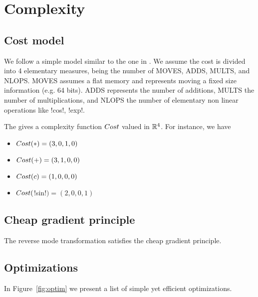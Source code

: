 \section{Complexity}
\label{sec:complexity}

\subsection{Cost model}
\label{sub:costModel}

We follow a simple model similar to the one in \cite{griewank2008evaluating}.
We assume the cost is divided into 4 elementary measures, being the number of MOVES, ADDS, MULTS, and NLOPS.
MOVES assumes a flat memory and represents moving a fixed size information  (e.g. 64 bits). 
ADDS represents the number of additions, 
MULTS the number of multiplications, 
and NLOPS the number of elementary non linear operations like !cos!, !exp!.

The gives a complexity function $Cost$ valued in $\mathbb{R}^4$. 
For instance, we have 

\begin{itemize}
    \item $Cost(*)=(3,0,1,0)$
    \item $Cost(+)=(3,1,0,0)$
    \item $Cost(c)=(1,0,0,0)$
    \item $Cost($!sin!$)=(2,0,0,1)$
\end{itemize}



\subsection{Cheap gradient principle}

\begin{theorem}
    The reverse mode transformation satisfies the cheap gradient principle.
\end{theorem}

\subsection{Optimizations} %
\label{sub:Optimizations}

In Figure~\ref{fig:optim} we present a list of simple yet efficient optimizations.

